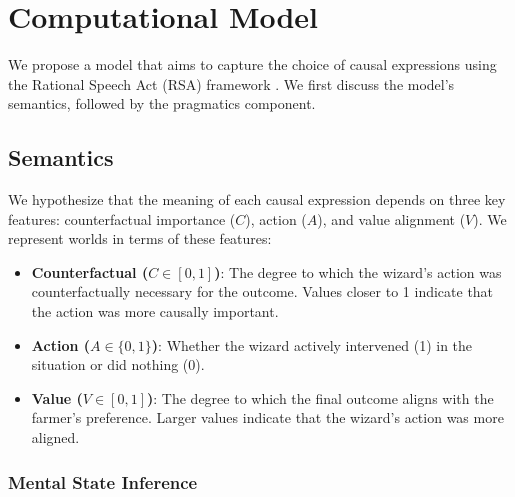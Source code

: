 \documentclass[10pt,letterpaper]{article}
\begin{document}
\section{Computational Model}

We propose a model that aims to capture the choice of causal expressions using the Rational Speech Act (RSA) framework \citep{GOODMAN2016818}. 
We first discuss the model's semantics, followed by the pragmatics component.


\subsection{Semantics}


We hypothesize that the meaning of each causal expression depends on three key features: counterfactual importance ($C$), 
action ($A$), and value alignment ($V$). 
We represent worlds in terms of these features:

\begin{itemize}
    \item \textbf{Counterfactual ($C \in [0,1]$)}: The degree to which the wizard's action was counterfactually necessary for the outcome.
    Values closer to 1 indicate that the action was more causally important.

    \item \textbf{Action ($A \in \{0, 1\}$)}: Whether the wizard actively intervened (1) in the situation or did nothing (0).
    \item \textbf{Value ($V \in [0,1]$)}: The degree to which the final outcome aligns with the farmer's preference.
    Larger values indicate that the wizard's action was more aligned.
\end{itemize}



\subsubsection{Mental State Inference}
\end{document}
